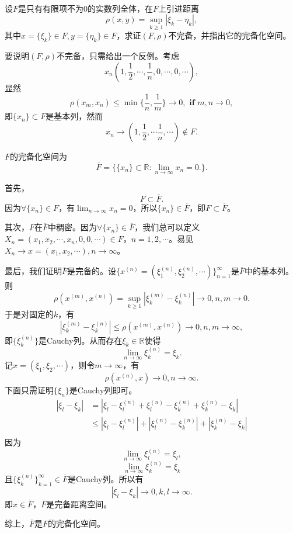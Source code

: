 \begin{exercise}
\hfill\\
设$F$是只有有限项不为0的实数列全体，在$F$上引进距离
$$\rho(x,y)=\sup_{k\geq1}|\xi_k-\eta_k|,$$
其中$x=\{\xi_k\}\in F,y=\{\eta_k\}\in F$，求证$(F,\rho)$不完备，并指出它的完备化空间。

要说明$(F,\rho)$不完备，只需给出一个反例。考虑$$x_n(1,\frac{1}{2},\cdots,\frac{1}{n},0,\cdots,0,\cdots),$$
显然$$\rho(x_m,x_n)\leq\min\{\frac{1}{n},\frac{1}{m}\}\rightarrow0,\textbf{ if }m,n\rightarrow0,$$
即$\{x_n\}\subset F$是基本列，然而
$$x_n\rightarrow(1,\frac{1}{2},\cdots\frac{1}{n},\cdots)\not\in F.$$

$F$的完备化空间为
$$\overline{F}=\{\{x_n\}\subset\mathbb{R}:\lim_{n\rightarrow\infty}x_n=0.\}.$$

首先，$$F\subset\overline{F}.$$
因为$\forall\{x_n\}\in F$，有$\lim_{n\rightarrow\infty}x_n=0$，所以$\{x_n\}\in\overline{F}$，即$F\subset\overline{F}$。

其次，$F$在$\overline{F}$中稠密。因为$\forall\{x_n\}\in\overline{F}$，我们总可以定义$X_n=(x_1,x_2,\cdots,x_n,0,0,\cdots)\in F$，$n=1,2,\cdots$。易见$X_n\rightarrow x=(x_1,x_2,\cdots),n\rightarrow\infty$。

最后，我们证明$\overline{F}$是完备的。设$\{x^{(n)}=(\xi_1^{(n)},\xi_2^{(n)},\cdots)\}_{n=1}^{\infty}$是$\overline{F}$中的基本列。则$$\rho(x^{(m)},x^{(n)})=\sup_{k\geq1}|\xi_k^{(m)}-\xi_k^{(n)}|\rightarrow0,n,m\rightarrow0.$$
于是对固定的$k$，有
$$|\xi_k^{(m)}-\xi_k^{(n)}|\leq\rho(x^{(m)},x^{(n)})\rightarrow0,n,m\rightarrow\infty,$$
即$\{\xi_k^{(n)}\}$是Cauchy列。从而存在$\xi_k\in\mathbb{R}$使得$$\lim_{n\rightarrow\infty}\xi_k^{(n)}=\xi_k.$$
记$x=(\xi_1,\xi_2,\cdots)$，则令$m\rightarrow\infty$，有
$$\rho(x^{(n)},x)\rightarrow0,n\rightarrow\infty.$$
下面只需证明$\{\xi_n\}$是Cauchy列即可。
\begin{align*}
|\xi_l-\xi_k|&=|\xi_l-\xi_l^{(n)}+\xi_l^{(n)}-\xi_k^{(n)}+\xi_k^{(n)}-\xi_k|\\
&\leq|\xi_l-\xi_l^{(n)}|+|\xi_l^{(n)}-\xi_k^{(n)}|+|\xi_k^{(n)}-\xi_k|\\
\end{align*}
因为$$\lim_{n\rightarrow\infty}\xi_l^{(n)}=\xi_l,$$$$\lim_{n\rightarrow\infty}\xi_k^{(n)}=\xi_k$$
且$\{\xi_k^{(n)}\}_{k=1}^{\infty}\in\overline{F}$是Cauchy列。所以有
$$|\xi_l-\xi_k|\rightarrow0,k,l\rightarrow\infty.$$
即$x\in\overline{F}$，$\overline{F}$是完备距离空间。

综上，$\overline{F}$是$F$的完备化空间。
\end{exercise}
\hfill\\
